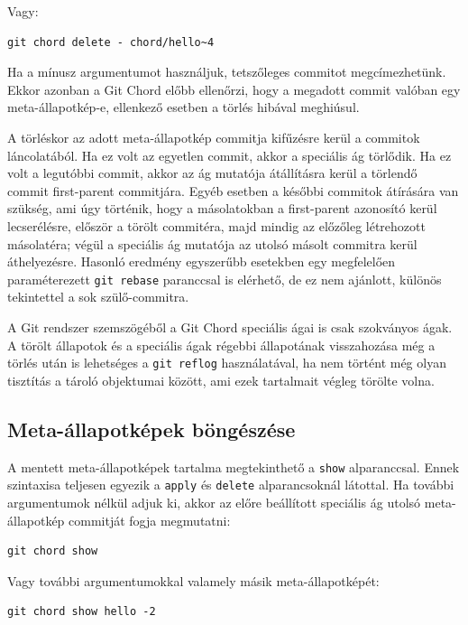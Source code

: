 \documentclass[
]{elteikthesis}[2025/03/25]
\begin{document}
Vagy:

\begin{verbatim}
git chord delete - chord/hello~4
\end{verbatim}

Ha a mínusz argumentumot használjuk, tetszőleges commitot megcímezhetünk.
Ekkor azonban a Git Chord előbb ellenőrzi,
hogy a megadott commit valóban egy meta-állapotkép-e,
ellenkező esetben a törlés hibával meghiúsul.

A törléskor az adott meta-állapotkép commitja kifűzésre kerül a commitok láncolatából.
Ha ez volt az egyetlen commit, akkor a speciális ág törlődik.
Ha ez volt a legutóbbi commit, akkor az ág mutatója átállításra kerül
a törlendő commit first-parent commitjára.
Egyéb esetben a későbbi commitok átírására van szükség,
ami úgy történik, hogy a másolatokban a first-parent azonosító kerül lecserélésre,
először a törölt commitéra, majd mindig az előzőleg létrehozott másolatéra;
végül a speciális ág mutatója az utolsó másolt commitra kerül áthelyezésre.
Hasonló eredmény egyszerűbb esetekben egy megfelelően paraméterezett \verb|git rebase|
paranccsal is elérhető,
de ez nem ajánlott, különös tekintettel a sok szülő-commitra.

A Git rendszer szemszögéből a Git Chord speciális ágai is csak szokványos ágak.
A törölt állapotok és a speciális ágak régebbi állapotának visszahozása
még a törlés után is lehetséges a \verb|git reflog| használatával,
ha nem történt még olyan tisztítás a tároló objektumai között,
ami ezek tartalmait végleg törölte volna.

\subsection{Meta-állapotképek böngészése}

A mentett meta-állapotképek tartalma megtekinthető a \verb|show| alparanccsal.
Ennek szintaxisa teljesen egyezik a \verb|apply| és \verb|delete| alparancsoknál látottal.
Ha további argumentumok nélkül adjuk ki, akkor az előre beállított speciális ág
utolsó meta-állapotkép commitját fogja megmutatni:

\begin{verbatim}
git chord show
\end{verbatim}

Vagy további argumentumokkal valamely másik meta-állapotképét:

\begin{verbatim}
git chord show hello -2
\end{verbatim}
\end{document}
